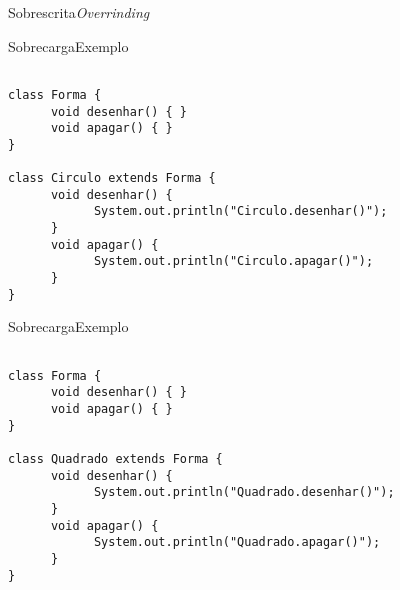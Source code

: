 \begin{frame}{Sobrescrita}{\it Overrinding}

\end{frame}

\begin{frame}[fragile]{Sobrecarga}{Exemplo}

\begin{center}

\begin{lstlisting}

class Forma {
      void desenhar() { }
      void apagar() { }
}

class Circulo extends Forma {
      void desenhar() { 
            System.out.println("Circulo.desenhar()");
      }
      void apagar() { 
            System.out.println("Circulo.apagar()");
      }
}
\end{lstlisting}

\end{center}

\end{frame}

\begin{frame}[fragile]{Sobrecarga}{Exemplo}

\begin{center}

\begin{lstlisting}

class Forma {
      void desenhar() { }
      void apagar() { }
}

class Quadrado extends Forma {
      void desenhar() { 
            System.out.println("Quadrado.desenhar()");
      }
      void apagar() { 
            System.out.println("Quadrado.apagar()");
      }
}
\end{lstlisting}

\end{center}

\end{frame}


